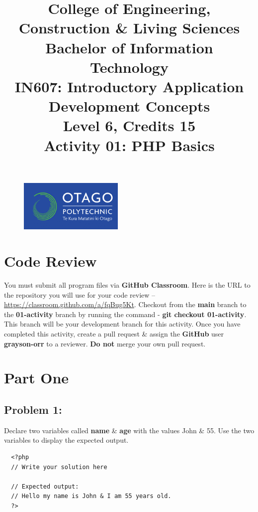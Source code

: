 \documentclass{article}
\author{}
\begin{document}
\begin{figure}
    \centering
    \includegraphics[width=50mm]{./img/logo.png}
\end{figure}

\title{College of Engineering, Construction \& Living Sciences\\Bachelor of Information Technology\\IN607: Introductory Application Development Concepts\\Level 6, Credits 15\\\textbf{Activity 01: PHP Basics}}
\date{}
\maketitle

\section*{Code Review}
You must submit all program files via \textbf{GitHub Classroom}. Here is the URL to the repository you will use for your code review – \href{https://classroom.github.com/a/fqBug5Kt}{https://classroom.github.com/a/fqBug5Kt}. Checkout from the \textbf{main} branch to the \textbf{01-activity} branch by running the command - \textbf{git checkout 01-activity}. This branch will be your development branch for this activity. Once you have completed this activity, create a pull request \& assign the \textbf{GitHub} user \textbf{grayson-orr} to a reviewer. \textbf{Do not} merge your own pull request.

\section*{Part One}

\subsection*{Problem 1:} 
Declare two variables called \textbf{name} \& \textbf{age} with the values John \& 55. Use the two variables to display the expected output.

\begin{verbatim}
  <?php
  // Write your solution here

  // Expected output:
  // Hello my name is John & I am 55 years old.
  ?>
\end{verbatim}
\end{document}
